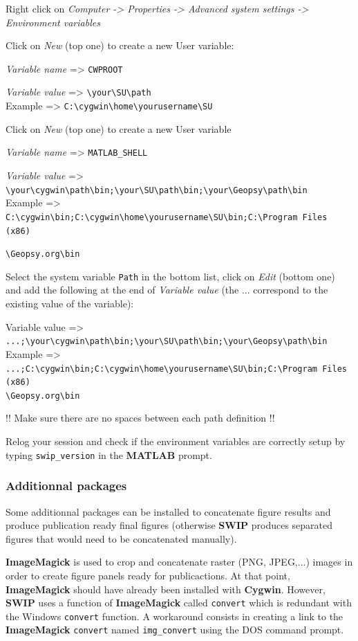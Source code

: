 \documentclass[twoside,a4paper]{article}
\def\SWIP{\textbf{SWIP}}
\def\SU{\textbf{SU}}
\def\Geopsy{\textbf{Geospy}}
\def\ImageMagick{\textbf{ImageMagick}}
\def\MATLAB{\textbf{MATLAB}}
\def\Cygwin{\textbf{Cygwin}}
\begin{document}
Right click on \textit{Computer -> Properties -> Advanced system settings -> Environment variables}

Click on \textit{New} (top one) to create a new User variable:

\textit{Variable name} => \verb|CWPROOT|

\textit{Variable value} => \verb|\your\SU\path|\\
Example => \verb|C:\cygwin\home\yourusername\SU|

Click on \textit{New} (top one) to create a new User variable

\textit{Variable name} => \verb|MATLAB_SHELL|

\textit{Variable value} => \verb|\your\cygwin\path\bin;\your\SU\path\bin;\your\Geopsy\path\bin|\\
Example => \verb|C:\cygwin\bin;C:\cygwin\home\yourusername\SU\bin;C:\Program Files (x86)|

\verb|\Geopsy.org\bin|

Select the system variable \verb|Path| in the bottom list, click on \textit{Edit} (bottom one) and add the following at the end of \textit{Variable value} (the ... correspond to the existing value of the variable):

Variable value => \verb|...;\your\cygwin\path\bin;\your\SU\path\bin;\your\Geopsy\path\bin|\\
Example => \verb|...;C:\cygwin\bin;C:\cygwin\home\yourusername\SU\bin;C:\Program Files (x86)|\\
\verb|\Geopsy.org\bin|

!! Make sure there are no spaces between each path definition !!

Relog your session and check if the environment variables are correctly setup by typing \verb|swip_version| in the {\MATLAB} prompt.

\subsubsection{Additionnal packages}
\label{subsec:WinExtra}
Some additionnal packages can be installed to concatenate figure results and produce publication ready final figures (otherwise {\SWIP} produces separated figures that would need to be concatenated manually).

{\ImageMagick} is used to crop and concatenate raster (PNG, JPEG,...) images in order to create figure panels ready for publicactions. At that point, {\ImageMagick} should have already been installed with {\Cygwin}. However, {\SWIP} uses a function of {\ImageMagick} called \verb|convert| which is redundant with the Windows \verb|convert| function. A workaround consists in creating a link to the {\ImageMagick} \verb|convert| named \verb|img_convert| using the DOS command prompt.
\end{document}
